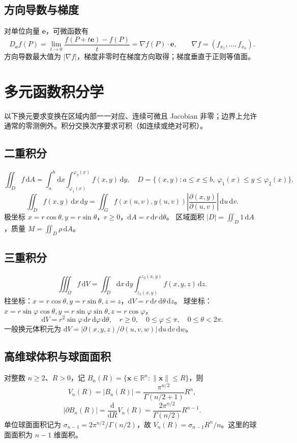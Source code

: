 \documentclass[../main.tex]{subfiles}
\begin{document}
\subsection{方向导数与梯度}
\par\pagebreak[0]\begin{samepage}
对单位向量 $\bm e$，可微函数有
\[
D_{\bm e}f(P)=\lim_{t\to0}\frac{f(P+t\bm e)-f(P)}t
=\nabla f(P)\cdot\bm e,\qquad \nabla f=(f_{x_1},\ldots,f_{x_n}).
\]
方向导数最大值为 $|\nabla f|$，梯度非零时在梯度方向取得；梯度垂直于正则等值面。
\par\end{samepage}\pagebreak[0]
\section{多元函数积分学}
以下换元要求变换在区域内部一一对应、连续可微且 Jacobian 非零；边界上允许通常的零测例外。积分交换次序要求可积（如连续或绝对可积）。
\subsection{二重积分}
\[
\iint_D f\,\mathrm dA=\int_a^b\!\mathrm dx\int_{\varphi_1(x)}^{\varphi_2(x)}f(x,y)\,\mathrm dy,
\quad D=\{(x,y):a\le x\le b,\ \varphi_1(x)\le y\le\varphi_2(x)\}.
\]
\[
\iint_D f(x,y)\,\mathrm dx\,\mathrm dy
=\iint_G f(x(u,v),y(u,v))\left|\frac{\partial(x,y)}{\partial(u,v)}\right|\,\mathrm du\,\mathrm dv.
\]
极坐标 $x=r\cos\theta,y=r\sin\theta$，$r\ge0$，$\mathrm dA=r\,\mathrm dr\,\mathrm d\theta$。
区域面积 $|D|=\iint_D1\,\mathrm dA$，质量 $M=\iint_D\rho\,\mathrm dA$。
\subsection{三重积分}
\[
\iiint_\Omega f\,\mathrm dV=\iint_D\!\mathrm dx\,\mathrm dy
\int_{z_1(x,y)}^{z_2(x,y)}f(x,y,z)\,\mathrm dz.
\]
柱坐标：$x=r\cos\theta,y=r\sin\theta,z=z$，$\mathrm dV=r\,\mathrm dr\,\mathrm d\theta\,\mathrm dz$。
球坐标：$x=r\sin\varphi\cos\theta,y=r\sin\varphi\sin\theta,z=r\cos\varphi$，
\[
\mathrm dV=r^2\sin\varphi\,\mathrm dr\,\mathrm d\varphi\,\mathrm d\theta,
\quad r\ge0,\quad0\le\varphi\le\pi,\quad0\le\theta<2\pi.
\]
一般换元体积元为 $\mathrm dV=|\partial(x,y,z)/\partial(u,v,w)|\,\mathrm du\,\mathrm dv\,\mathrm dw$。
\subsection{高维球体积与球面面积}
对整数 $n\ge2$、$R>0$，记 $B_n(R)=\{\bm x\in\mathbb R^n:\|\bm x\|\le R\}$，则
\[
V_n(R)=|B_n(R)|=\frac{\pi^{n/2}}{\Gamma(n/2+1)}R^n,
\]
\[
|\partial B_n(R)|=\frac{\mathrm d}{\mathrm dR}V_n(R)
=\frac{2\pi^{n/2}}{\Gamma(n/2)}R^{n-1}.
\]
单位球面面积记为 $\sigma_{n-1}=2\pi^{n/2}/\Gamma(n/2)$，故 $V_n(R)=\sigma_{n-1}R^n/n$。这里的球面面积为 $n-1$ 维面积。
\end{document}
